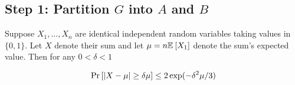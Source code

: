 \documentclass[11pt]{article}
\begin{document}
\subsection{Step 1: Partition $G$ into $A$ and $B$}

\begin{lemma}\label{lemma:mult-chernoff}
Suppose $X_1, ..., X_n$ are identical independent random variables taking values in $\{0, 1\}$. Let $X$ denote their sum and let $\mu = n\mathbb{E}_{}\left[X_1\right]$ denote the sum's expected value. Then for any $0 < \delta < 1$

\[ \Pr\left[|X - \mu| \geq \delta \mu \right] \leq 2\exp(-\delta^2\mu/3)\]
	
\end{lemma}

\end{document}
